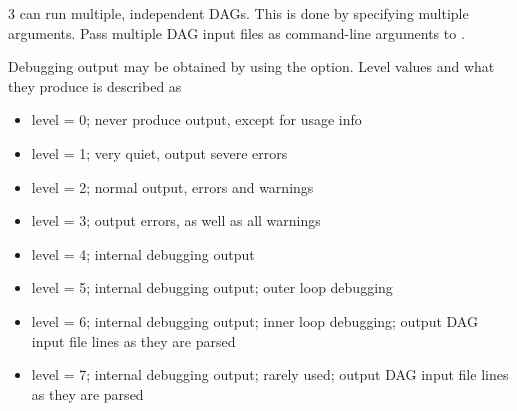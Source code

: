 \begin{ManPage}{\label{man-condor-dagman}}{3}
 can run multiple, independent DAGs.  This is done
by specifying multiple  arguments.
Pass multiple
DAG input files as command-line arguments to .

Debugging output may be obtained by using the
 option.
Level values and what they produce is described as
\begin{itemize}
  \item level = 0; never produce output, 
        except for usage info 
  \item level = 1; very quiet, output severe errors 
  \item level = 2; normal output, errors and warnings
  \item level = 3; output errors, as well as all warnings
  \item level = 4; internal debugging output
  \item level = 5; internal debugging output; outer loop debugging
  \item level = 6; internal debugging output; inner loop debugging;
output DAG input file lines as they are parsed
  \item level = 7; internal debugging output; rarely used;
output DAG input file lines as they are parsed
\end{itemize}



\end{ManPage}
